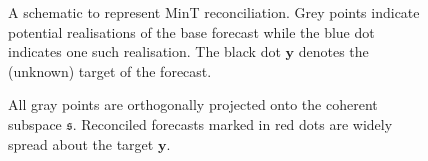 \documentclass[12pt]{article}
\theoremstyle{definition}
\theoremstyle{property}
\begin{document}
	\begin{figure}[H]
		\centering
		\small
		\resizebox{\linewidth}{!}{
			
		}
		\caption{A schematic to represent MinT reconciliation. Grey points indicate potential realisations of the base forecast while the blue dot indicates one such realisation. The black dot ${\bm y}$ denotes the (unknown) target of the forecast.}\label{fig:MinT_justification2}
	\end{figure}
	
	\begin{figure}[H]
		\centering
		\small
		\caption{All gray points are orthogonally projected onto the coherent subspace $\mathfrak{s}$. Reconciled forecasts marked in red dots are widely spread about the target $\bm{y}$.}\label{fig:Orthogonal_projection_all_points}
	\end{figure}
	
\end{document}
